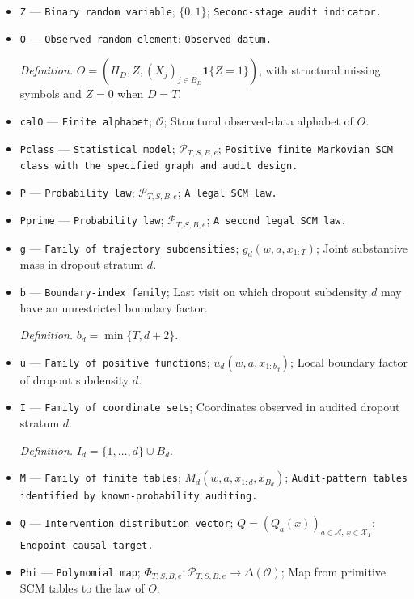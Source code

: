 \documentclass{article}
\begin{document}
\begin{itemize}
  \item \texttt{Z} --- \texttt{Binary random variable}; \(\{0,1\}\); \texttt{Second-\allowbreak{}stage audit indicator.}
  \item \texttt{O} --- \texttt{Observed random element}; \texttt{Observed datum.}
  \par\smallskip\noindent\emph{Definition.} \(O=(H_D,Z,(X_j)_{j\in B_D}\mathbf 1\{Z=1\})\), with structural missing symbols and \(Z=0\) when \(D=T\).
  \item \texttt{calO} --- \texttt{Finite alphabet}; \(\mathcal O\); Structural observed-data alphabet of \(O\).
  \item \texttt{Pclass} --- \texttt{Statistical model}; \(\mathcal P_{T,S,B,e}\); \texttt{Positive finite Markovian SCM class with the specified graph and audit design.}
  \item \texttt{P} --- \texttt{Probability law}; \(\mathcal P_{T,S,B,e}\); \texttt{A legal SCM law.}
  \item \texttt{Pprime} --- \texttt{Probability law}; \(\mathcal P_{T,S,B,e}\); \texttt{A second legal SCM law.}
  \item \texttt{g} --- \texttt{Family of trajectory subdensities}; \(g_d(w,a,x_{1:T})\); Joint substantive mass in dropout stratum \(d\).
  \item \texttt{b} --- \texttt{Boundary-\allowbreak{}index family}; Last visit on which dropout subdensity \(d\) may have an unrestricted boundary factor.
  \par\smallskip\noindent\emph{Definition.} \(b_d=\min\{T,d+2\}\).
  \item \texttt{u} --- \texttt{Family of positive functions}; \(u_d(w,a,x_{1:b_d})\); Local boundary factor of dropout subdensity \(d\).
  \item \texttt{I} --- \texttt{Family of coordinate sets}; Coordinates observed in audited dropout stratum \(d\).
  \par\smallskip\noindent\emph{Definition.} \(I_d=\{1,\ldots,d\}\cup B_d\).
  \item \texttt{M} --- \texttt{Family of finite tables}; \(M_d(w,a,x_{1:d},x_{B_d})\); \texttt{Audit-\allowbreak{}pattern tables identified by known-\allowbreak{}probability auditing.}
  \item \texttt{Q} --- \texttt{Intervention distribution vector}; \(Q=(Q_a(x))_{a\in\mathcal A,\,x\in\mathcal X_T}\); \texttt{Endpoint causal target.}
  \item \texttt{Phi} --- \texttt{Polynomial map}; \(\Phi_{T,S,B,e}:\mathcal P_{T,S,B,e}\to\Delta(\mathcal O)\); Map from primitive SCM tables to the law of \(O\).

\end{itemize}
\end{document}
